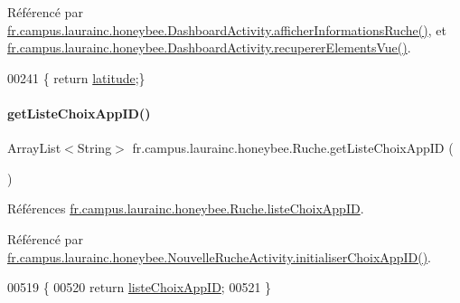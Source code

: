 Référencé par \hyperlink{classfr_1_1campus_1_1laurainc_1_1honeybee_1_1_dashboard_activity_a88f00531bee33bd6c47b33f5ac4df9ed}{fr.\+campus.\+laurainc.\+honeybee.\+Dashboard\+Activity.\+afficher\+Informations\+Ruche()}, et \hyperlink{classfr_1_1campus_1_1laurainc_1_1honeybee_1_1_dashboard_activity_a2ab46c5580913347e2dd18976be5900a}{fr.\+campus.\+laurainc.\+honeybee.\+Dashboard\+Activity.\+recuperer\+Elements\+Vue()}.


\begin{DoxyCode}
00241 \{ \textcolor{keywordflow}{return} \hyperlink{classfr_1_1campus_1_1laurainc_1_1honeybee_1_1_ruche_a6898723eb97e6f32cbf2c63032f8aec4}{latitude};\}
\end{DoxyCode}
\mbox{\label{classfr_1_1campus_1_1laurainc_1_1honeybee_1_1_ruche_a08d58dc3ce2db9adc37903c9b2f08977}} 
\paragraph{\texorpdfstring{get\+Liste\+Choix\+App\+I\+D()}{getListeChoixAppID()}}
{\footnotesize\ttfamily Array\+List$<$String$>$ fr.\+campus.\+laurainc.\+honeybee.\+Ruche.\+get\+Liste\+Choix\+App\+ID (\begin{DoxyParamCaption}{ }\end{DoxyParamCaption})}



Références \hyperlink{classfr_1_1campus_1_1laurainc_1_1honeybee_1_1_ruche_a839228c6a5015c4c3db018316e4e776f}{fr.\+campus.\+laurainc.\+honeybee.\+Ruche.\+liste\+Choix\+App\+ID}.



Référencé par \hyperlink{classfr_1_1campus_1_1laurainc_1_1honeybee_1_1_nouvelle_ruche_activity_a25bf91899b217681bda733e7783d0bf9}{fr.\+campus.\+laurainc.\+honeybee.\+Nouvelle\+Ruche\+Activity.\+initialiser\+Choix\+App\+I\+D()}.


\begin{DoxyCode}
00519     \{
00520         \textcolor{keywordflow}{return} \hyperlink{classfr_1_1campus_1_1laurainc_1_1honeybee_1_1_ruche_a839228c6a5015c4c3db018316e4e776f}{listeChoixAppID};
00521     \}
\end{DoxyCode}
\mbox{\label{classfr_1_1campus_1_1laurainc_1_1honeybee_1_1_ruche_a7108fb412c0628d3966aa8c76fd9e2b7}} 
